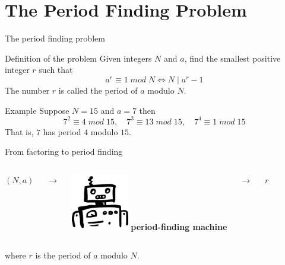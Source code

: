 \documentclass{beamer}
\begin{document}
    \section{The Period Finding Problem}
    \begin{frame}{The period finding problem}
        \begin{alertblock}{Definition of the problem}
            Given integers $N$ and $a$, find the smallest positive integer $r$ such that
            $$ a^r \equiv 1 \; mod \; N \iff N \; | \; a^r - 1$$
            The number $r$ is called the period of $a$ modulo $N$.
        \end{alertblock}

        \begin{exampleblock}{Example}
            Suppose $N = 15$ and $a=7$ then
            \begin{equation*}
                    7^2 \equiv 4 \; mod \; 15, \quad
                    7^3 \equiv 13 \; mod \; 15, \quad
                    7^4 \equiv 1 \; mod \; 15 
            \end{equation*}
            That is, $7$ has period $4$ modulo $15$.
        \end{exampleblock}
    \end{frame}
    

    \begin{frame}{From factoring to period finding}
        \begin{columns}[t, onlytextwidth]
            \centering
            \Huge $(N, a)$

            \centering
            \Huge $\rightarrow$

            \centering
            \includegraphics[height=2.5cm,keepaspectratio]{images/robot.pdf}
            \vfill
            \footnotesize \textbf{period-finding machine}

            \centering
            \Huge $\rightarrow$

            \centering
            \Huge $r$ 
        \end{columns}
        \vspace{1.5cm}
        where $r$ is the period of $a$ modulo $N$.
    \end{frame}
\end{document}
